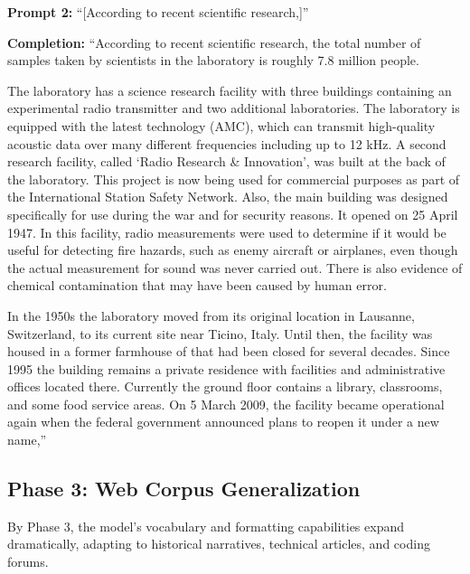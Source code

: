 \documentclass[12pt]{article}
\begin{document}
\begin{mdframed}[backgroundcolor=gray!10, roundcorner=5pt]
\raggedright
\textbf{Prompt 2:} ``[According to recent scientific research,]''

\textbf{Completion:} ``According to recent scientific research, the total number of samples taken by scientists in the laboratory is roughly 7.8 million people.

The laboratory has a science research facility with three buildings containing an experimental radio transmitter and two additional laboratories. The laboratory is equipped with the latest technology (AMC), which can transmit high-quality acoustic data over many different frequencies including up to 12 kHz. A second research facility, called `Radio Research \& Innovation', was built at the back of the laboratory. This project is now being used for commercial purposes as part of the International Station Safety Network. Also, the main building was designed specifically for use during the war and for security reasons. It opened on 25 April 1947. In this facility, radio measurements were used to determine if it would be useful for detecting fire hazards, such as enemy aircraft or airplanes, even though the actual measurement for sound was never carried out. There is also evidence of chemical contamination that may have been caused by human error.

In the 1950s the laboratory moved from its original location in Lausanne, Switzerland, to its current site near Ticino, Italy. Until then, the facility was housed in a former farmhouse of that had been closed for several decades. Since 1995 the building remains a private residence with facilities and administrative offices located there. Currently the ground floor contains a library, classrooms, and some food service areas. On 5 March 2009, the facility became operational again when the federal government announced plans to reopen it under a new name,''
\end{mdframed}

\subsection{Phase 3: Web Corpus Generalization}
By Phase 3, the model's vocabulary and formatting capabilities expand dramatically, adapting to historical narratives, technical articles, and coding forums.
\end{document}
